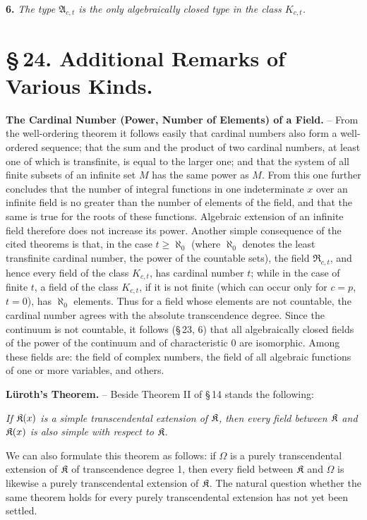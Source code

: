 \textbf{6.} \emph{The type \(\mathfrak A_{c,t}\) is the only algebraically closed type in the class \(K_{c,t}\).}

\section*{\S\,24. Additional Remarks of Various Kinds.}

\textbf{The Cardinal Number (Power, Number of Elements) of a Field.} -- From the well-ordering theorem it follows easily that cardinal numbers also form a well-ordered sequence; that the sum and the product of two cardinal numbers, at least one of which is transfinite, is equal to the larger one; and that the system of all finite subsets of an infinite set \(M\) has the same power as \(M\). From this one further concludes that the number of integral functions in one indeterminate \(x\) over an infinite field is no greater than the number of elements of the field, and that the same is true for the roots of these functions. Algebraic extension of an infinite field therefore does not increase its power. Another simple consequence of the cited theorems is that, in the case \(t\geq\aleph_0\) (where \(\aleph_0\) denotes the least transfinite cardinal number, the power of the countable sets), the field \(\mathfrak R_{c,t}\), and hence every field of the class \(K_{c,t}\), has cardinal number \(t\); while in the case of finite \(t\), a field of the class \(K_{c,t}\), if it is not finite (which can occur only for \(c=p\), \(t=0\)), has \(\aleph_0\) elements. Thus for a field whose elements are not countable, the cardinal number agrees with the absolute transcendence degree. Since the continuum is not countable, it follows (\S\,23, 6) that all algebraically closed fields of the power of the continuum and of characteristic 0 are isomorphic. Among these fields are: the field of complex numbers, the field of all algebraic functions of one or more variables, and others.

\textbf{Lüroth's Theorem.} -- Beside Theorem II of \S\,14 stands the following:

\emph{If \(\mathfrak K(x)\) is a simple transcendental extension of \(\mathfrak K\), then every field between \(\mathfrak K\) and \(\mathfrak K(x)\) is also simple with respect to \(\mathfrak K\).}

We can also formulate this theorem as follows: if \(\Omega\) is a purely transcendental extension of \(\mathfrak K\) of transcendence degree 1, then every field between \(\mathfrak K\) and \(\Omega\) is likewise a purely transcendental extension of \(\mathfrak K\). The natural question whether the same theorem holds for every purely transcendental extension has not yet been settled.

